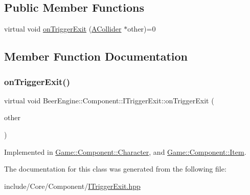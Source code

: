 \subsection*{Public Member Functions}
\begin{DoxyCompactItemize}
\item 
virtual void \mbox{\hyperlink{class_beer_engine_1_1_component_1_1_i_trigger_exit_ad5bc744f738cb2c52de40b243954967f}{on\+Trigger\+Exit}} (\mbox{\hyperlink{class_beer_engine_1_1_component_1_1_a_collider}{A\+Collider}} $\ast$other)=0
\end{DoxyCompactItemize}


\subsection{Member Function Documentation}
\mbox{\label{class_beer_engine_1_1_component_1_1_i_trigger_exit_ad5bc744f738cb2c52de40b243954967f}} 
\subsubsection{\texorpdfstring{on\+Trigger\+Exit()}{onTriggerExit()}}
{\footnotesize\ttfamily virtual void Beer\+Engine\+::\+Component\+::\+I\+Trigger\+Exit\+::on\+Trigger\+Exit (\begin{DoxyParamCaption}\item[{\mbox{\hyperlink{class_beer_engine_1_1_component_1_1_a_collider}{A\+Collider}} $\ast$}]{other }\end{DoxyParamCaption})\hspace{0.3cm}{\ttfamily [pure virtual]}}



Implemented in \mbox{\hyperlink{class_game_1_1_component_1_1_character_a1acc86ac5340ef65ba18d755f1ea37f9}{Game\+::\+Component\+::\+Character}}, and \mbox{\hyperlink{class_game_1_1_component_1_1_item_a33c72fb48b46ce7b67b924472d0f3456}{Game\+::\+Component\+::\+Item}}.



The documentation for this class was generated from the following file\+:\begin{DoxyCompactItemize}
\item 
include/\+Core/\+Component/\mbox{\hyperlink{_i_trigger_exit_8hpp}{I\+Trigger\+Exit.\+hpp}}\end{DoxyCompactItemize}
